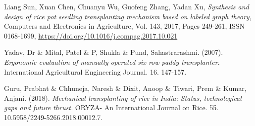 \documentclass[a4paper,latin,center,onecolumn]{paper}
\begin{document}
    \begin{thebibliography}{999}

            Liang Sun, Xuan Chen, Chuanyu Wu, Guofeng Zhang, Yadan Xu, 
            \emph{Synthesis and design of rice pot seedling transplanting mechanism based on labeled graph theory},
            Computers and Electronics in Agriculture,
            Vol. 143,
            2017,
            Pages 249-261,
            ISSN 0168-1699,
            \href{https://doi.org/10.1016/j.compag.2017.10.021}{https://doi.org/10.1016/j.compag.2017.10.021}
            
            Yadav, Dr \& Mital, Patel \& P, Shukla \& Pund, Sahastrarashmi. (2007). \emph{Ergonomic evaluation of manually operated six-row paddy transplanter.} International Agricultural Engineering Journal. 16. 147-157. 
        
            Guru, Prabhat \& Chhuneja, Naresh \& Dixit, Anoop \& Tiwari, Prem \& Kumar, Anjani. (2018). \emph{Mechanical transplanting of rice in India: Status, technological gaps and future thrust.} ORYZA- An International Journal on Rice. 55. 10.5958/2249-5266.2018.00012.7. 
        
    \end{thebibliography}
\end{document}
